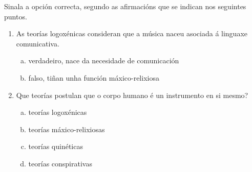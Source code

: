 
\begin{ejercicio}
Sinala a opción correcta, segundo as afirmacións que se indican nos seguintes puntos.
\begin{enumerate}[1)]
 \item 
 As teorías logoxénicas consideran que a música naceu asociada á linguaxe comunicativa.
  \begin{enumerate}[a)]
   \item %
   verdadeiro, nace da necesidade de comunicación
   \item 
   falso, tiñan unha función máxico-relixiosa
  \end{enumerate}
  \item
  Que teorías postulan que o corpo humano é un instrumento en si mesmo? 
  \begin{enumerate}[a)]
   \item 
   teorías logoxénicas
   \item 
   teorías máxico-relixiosas
   \item %
   teorías quinéticas
   \item 
   teorías conspirativas
  \end{enumerate}
 \end{enumerate}

\end{ejercicio}



